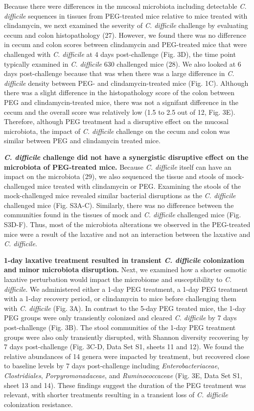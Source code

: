 \documentclass[
  11pt,
]{article}
\begin{document}
Because there were differences in the mucosal microbiota including
detectable \emph{C. difficile} sequences in tissues from PEG-treated
mice relative to mice treated with clindamycin, we next examined the
severity of \emph{C. difficile} challenge by evaluating cecum and colon
histopathology (27). However, we found there was no difference in cecum
and colon scores between clindamycin and PEG-treated mice that were
challenged with \emph{C. difficile} at 4 days post-challenge (Fig. 3D),
the time point typically examined in \emph{C. difficile} 630 challenged
mice (28). We also looked at 6 days post-challenge because that was when
there was a large difference in \emph{C. difficile} density between PEG-
and clindamycin-treated mice (Fig. 1C). Although there was a slight
difference in the histopathology score of the colon between PEG and
clindamycin-treated mice, there was not a signifant difference in the
cecum and the overall score was relatively low (1.5 to 2.5 out of 12,
Fig. 3E). Therefore, although PEG treatment had a disruptive effect on
the mucosal microbiota, the impact of \emph{C. difficile} challenge on
the cecum and colon was similar between PEG and clindamycin treated
mice.

\textbf{\emph{C. difficile} challenge did not have a synergistic
disruptive effect on the microbiota of PEG-treated mice.} Because
\emph{C. difficile} itself can have an impact on the microbiota (29), we
also sequenced the tissue and stools of mock-challenged mice treated
with clindamycin or PEG. Examining the stools of the mock-challenged
mice revealed similar bacterial disruptions as the \emph{C. difficile}
challenged mice (Fig. S3A-C). Similarly, there was no difference between
the communities found in the tissues of mock and \emph{C. difficile}
challenged mice (Fig. S3D-F). Thus, most of the microbiota alterations
we observed in the PEG-treated mice were a result of the laxative and
not an interaction between the laxative and \emph{C. difficile}.

\textbf{1-day laxative treatment resulted in transient \emph{C.
difficile} colonization and minor microbiota disruption.} Next, we
examined how a shorter osmotic laxative perturbation would impact the
microbiome and susceptibility to \emph{C. difficile}. We administered
either a 1-day PEG treatment, a 1-day PEG treatment with a 1-day
recovery period, or clindamycin to mice before challenging them with
\emph{C. difficile} (Fig. 3A). In contrast to the 5-day PEG treated
mice, the 1-day PEG groups were only transiently colonized and cleared
\emph{C. difficile} by 7 days post-challenge (Fig. 3B). The stool
communities of the 1-day PEG treatment groups were also only transiently
disrupted, with Shannon diversity recovering by 7 days post-challenge
(Fig. 3C-D, Data Set S1, sheets 11 and 12). We found the relative
abundances of 14 genera were impacted by treatment, but recovered close
to baseline levels by 7 days post-challenge including
\emph{Enterobacteriaceae}, \emph{Clostridiales},
\emph{Porpyromonadaceae}, and \emph{Ruminococcaceae} (Fig. 3E, Data Set
S1, sheet 13 and 14). These findings suggest the duration of the PEG
treatment was relevant, with shorter treatments resulting in a transient
loss of \emph{C. difficile} colonization resistance.
\end{document}
